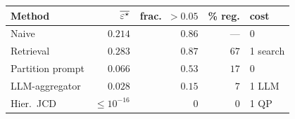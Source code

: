 \begin{tabular}{@{}lrrrl@{}}
\toprule
Method & $\overline{\varepsilon^\star}$ & frac.\ $>\!0.05$ & \% reg. & cost \\
\midrule
Naive             & $0.214$            & $0.86$ & ---   & 0 \\
Retrieval         & $0.283$            & $0.87$ & $67$  & 1 search \\
Partition prompt  & $0.066$            & $0.53$ & $17$  & 0 \\
LLM-aggregator    & $0.028$            & $0.15$ & $7$   & 1 LLM \\
\midrule
Hier.\ JCD        & $\le\!10^{-16}$    & $0$    & $0$   & 1 QP \\
\bottomrule
\end{tabular}
